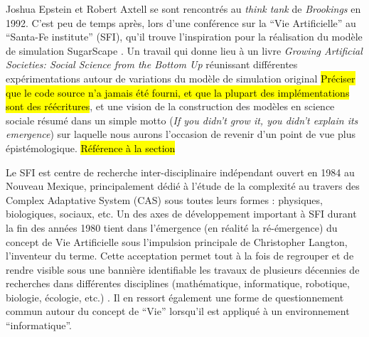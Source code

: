 
Joshua Epstein et Robert Axtell se sont rencontrés au \textit{think tank} de \textit{Brookings} en 1992. C'est peu de temps après, lors d'une conférence sur la \enquote{Vie Artificielle} au \foreignquote{english}{Santa-Fe institute} (SFI), qu'il trouve l'inspiration pour la réalisation du modèle de simulation SugarScape . Un travail qui donne lieu à un livre \textit{Growing Artificial Societies: Social Science from the Bottom Up} réunissant différentes expérimentations autour de variations du modèle de simulation original \hl{Préciser que le code source n'a jamais été fourni, et que la plupart des implémentations sont des réécritures}, et une vision de la construction des modèles en science sociale résumé dans un simple motto (\textit{If you didn’t grow it, you didn’t explain its emergence}) sur laquelle nous aurons l’occasion de revenir d'un point de vue plus épistémologique. \hl{Référence à la section}


Le SFI est centre de recherche inter-disciplinaire indépendant ouvert en 1984 au Nouveau Mexique, principalement dédié à l'étude de la complexité au travers des Complex Adaptative System (CAS) sous toutes leurs formes : physiques, biologiques, sociaux, etc. Un des axes de développement important à SFI durant la fin des années 1980 tient dans l'émergence (en réalité la ré-émergence) du concept de Vie Artificielle sous l'impulsion principale de Christopher Langton, l'inventeur du terme. Cette acceptation permet tout à la fois de regrouper et de rendre visible sous une bannière identifiable les travaux de plusieurs décennies de recherches dans différentes disciplines (mathématique, informatique, robotique, biologie, écologie, etc.)  \autocite{Taylor1999}. Il en ressort également une forme de questionnement commun autour du concept de \enquote{Vie} lorsqu'il est appliqué à un environnement \enquote{informatique}.

